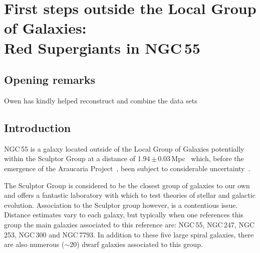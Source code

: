 \chapter{First steps outside the Local Group of Galaxies:\\
Red Supergiants in NGC\,55}





\section{Opening remarks} %
\label{sec:opening_remarks}

Owen has kindly helped reconstruct and combine the data sets


\section{Introduction} %
\label{sec:introduction}

NGC\,55 is a galaxy located outside of the Local Group of Galaxies potentially within the Sculptor Group at a distance of 1.94\,$\pm$\,0.03\,Mpc~\citep{2006AJ....132.2556P,2008ApJ...672..266G} which, before the emergence of the Araucaria Project~\citep{2005Msngr.121...23G}, been subject to considerable uncertainty~\citep[e.g.]{1987ApJ...323...79P,2006A&A...455..891V}.

The Sculptor Group is considered to be the closest group of galaxies to our own and offers a fantastic laboratory with which to test theories of stellar and galactic evolution.
Association to the Sculptor group however, is a contentious issue.
Distance estimates vary to each galaxy, but typically when one references this group the main galaxies associated to this reference are: NGC\,55, NGC\,247, NGC\,253, NGC\,300 and NGC\,7793.
In addition to these five large spiral galaxies, there are also numerous ($\sim$20) dwarf galaxies associated to this group.

